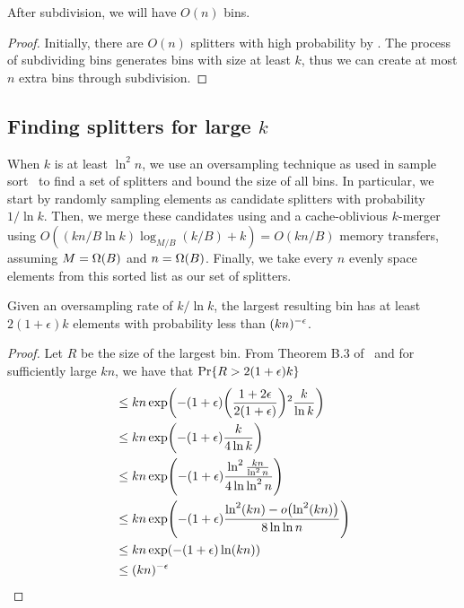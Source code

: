 \begin{lemma}
After subdivision, we will have $O(n)$ bins.
\end{lemma}
\begin{proof}
Initially, there are $O(n)$ splitters with high probability by .
The process of subdividing bins generates bins with size at least $k$, thus we
can create at most $n$ extra bins through subdivision.
\end{proof}

\subsection*{Finding splitters for large $k$}

When $k$ is at least $\ln ^2 n$, we use an oversampling technique as used in 
sample sort~\cite{BlellochLeMa91} to find a set of splitters and bound the 
size of all bins.  In particular, we start by randomly sampling elements as 
candidate splitters with probability $1/\ln k$.  Then, we merge these candidates
using and a cache-oblivious $k$-merger~\cite{FrigoLePr99} using 
$O((kn/B\ln k) \log_{M/B} (k/B) + k) = O(kn/B)$ memory transfers, assuming $M=\Omega \mathopen{}\left(B\right)\mathclose{}$
and $n=\Omega \mathopen{}\left(B\right)\mathclose{}$.  Finally, we take
every $n$ evenly space elements from this sorted list as our set of splitters.

\begin{theorem}
  Given an oversampling rate of $k/\ln k$, the largest resulting bin has at least 
  $2(1+\epsilon)k$ elements with probability less than $\mathopen{}\left(kn\right)\mathclose{}^{-\epsilon}$.
\end{theorem}
\begin{proof}
  Let $R$ be the size of the largest bin.  
  From Theorem B.3 of~\cite{BlellochLeMa91} and for sufficiently large $kn$, 
  we have that $\Pr\mathopen{}\left\{ R > 2(1+\epsilon)k \right\}\mathclose{}$
  \begin{align*}
    &\leq kn \exp \mathopen{}\left( -(1+\epsilon)\mathopen{}\left(\frac{1+2\epsilon}{2(1+\epsilon)}\right)\mathclose{}^2 \frac{k}{\ln k} \right)\mathclose{}\\
    &\leq kn \exp \mathopen{}\left(-(1+\epsilon)\frac{k}{4\ln k}\right)\mathclose{}\\
    &\leq {kn} \exp \mathopen{}\left(-(1+\epsilon)\frac{\ln^2 \frac{kn}{\ln^2 n}}{4 \ln \ln ^2 n}\right)\mathclose{}\\
    &\leq {kn} \exp \mathopen{}\left(-(1+\epsilon)\frac{\ln^2 \mathopen{}\left(kn\right)\mathclose{} - o\mathopen{}\left(\ln^2 \mathopen{}\left(kn\right)\mathclose{}\right)\mathclose{} }{8 \ln \ln n}\right)\mathclose{}\\
    &\leq {kn} \exp \mathopen{}\left(-(1+\epsilon)\ln \mathopen{}\left(kn\right)\mathclose{}\right)\mathclose{}\\
    &\leq \mathopen{}\left(kn\right)\mathclose{}^{-\epsilon}\\
  \end{align*}
\end{proof}



